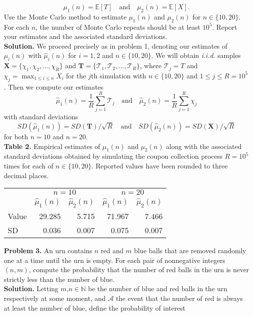 \documentclass[11pt, letterpaper]{article}
\newcommand{\bs}[1]{\boldsymbol{#1}}
\newcommand{\mbb}[1]{\mathbb{#1}}
\newcommand{\mc}[1]{\mathcal{#1}}
\begin{document}
    \[\mu_1(n)=\mbb{E}[T]\quad\text{and}\quad \mu_2(n)=\mbb{E}[X].\]
    Use the Monte Carlo method to estimate $\mu_1(n)$ and $\mu_2(n)$ for $n\in\{10,20\}$. For each $n$, the number of Monte Carlo repeats should be at least $10^5$. Report your estimates and the associated
    standard deviations.\\[10pt]
    {\bf Solution.} We proceed precisely as in problem 1, denoting our estimates of $\mu_i(n)$ with $\hat{\mu}_i(n)$ for $i=1,2$ and $n\in\{10,20\}$. We will obtain {\it i.i.d.} samples $\bs{X}=\{\chi_1,\chi_2,\dots,\chi_R\}$
    and $\bs{T}=\{\mathcal{T}_1,\mathcal{T}_2,\dots,\mathcal{T}_R\}$, where $\mathcal{T}_j=T$ and $\chi_j=\max_{1\leq i\leq n}X_i$ for the $j$th simulation with $n\in\{10,20\}$ and $1\leq j\leq R=10^5$. Then we compute our estimates
    \[\hat{\mu}_1(n)=\frac{1}{R}\sum_{j=1}^R\mathcal{T}_j\quad\text{and}\quad\hat{\mu}_2(n)=\frac{1}{R}\sum_{j=1}^R\chi_j\]
    with standard deviations
    \[SD(\hat{\mu}_1(n))=SD(\bs{T})/\sqrt{R}\quad\text{and}\quad SD(\hat{\mu}_2(n))=SD(\bs{X})/\sqrt{R}\]
    for both $n=10$ and $n=20$.\\[10pt]
    {\bf Table 2.} Empirical estimates of $\mu_1(n)$ and $\mu_2(n)$ along with the associated standard deviations obtained by simulating the coupon collection process
    $R=10^5$ times for each of $n\in\{10,20\}$. Reported values have been rounded to three decimal places.
    \begin{center}
        \begin{tabular}{@{}l|rrrr@{}}\toprule
                & \multicolumn{2}{c}{$n=10$} & \multicolumn{2}{c}{$n=20$}\\
            \cmidrule(lr){2-3}\cmidrule(lr){4-5}
                & $\hat{\mu}_1(n)$ & $\hat{\mu}_2(n)$ & $\hat{\mu}_1(n)$ & $\hat{\mu}_2(n)$\\\midrule
            Value & 29.285 & 5.715 & 71.967 & 7.466 \\ 
            SD & 0.036 & 0.007 & 0.075 & 0.007 \\
            \bottomrule
        \end{tabular}
    \end{center}
    {\bf Problem 3.} An urn contains $n$ red and $m$ blue balls that are removed randomly one at a time until the urn is empty. For each pair of nonnegative integers $(n,m)$, compute the probability that the 
    number of red balls in the urn is never strictly less than the number of blue.\\[10pt]
    {\bf Solution.} Letting $m$,$n\in\mbb{N}$ be the number of blue and red balls in the urn respectively at some moment, and $\mc{A}$ the event that the number of red is always at least the number of blue, define the probability of interest
\end{document}

